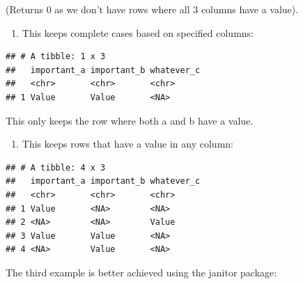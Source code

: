 \documentclass[
]{book}
\newenvironment{Shaded}{\begin{snugshade}}{\end{snugshade}}
\newcommand{\KeywordTok}[1]{\textcolor[rgb]{0.13,0.29,0.53}{\textbf{#1}}}
\newcommand{\NormalTok}[1]{#1}
\newcommand{\OperatorTok}[1]{\textcolor[rgb]{0.81,0.36,0.00}{\textbf{#1}}}
\newcommand{\StringTok}[1]{\textcolor[rgb]{0.31,0.60,0.02}{#1}}
\providecommand{\tightlist}{%
  \setlength{\itemsep}{0pt}\setlength{\parskip}{0pt}}
\begin{document}
(Returns 0 as we don't have rows where all 3 columns have a value).

\begin{enumerate}
\def\labelenumi{(\arabic{enumi})}
\setcounter{enumi}{1}
\tightlist
\item
  This keeps complete cases based on specified columns:
\end{enumerate}

\begin{Shaded}
\end{Shaded}

\begin{verbatim}
## # A tibble: 1 x 3
##   important_a important_b whatever_c
##   <chr>       <chr>       <chr>     
## 1 Value       Value       <NA>
\end{verbatim}

This only keeps the row where both a and b have a value.

\begin{enumerate}
\def\labelenumi{(\arabic{enumi})}
\setcounter{enumi}{2}
\tightlist
\item
  This keeps rows that have a value in any column:
\end{enumerate}

\begin{Shaded}
\end{Shaded}

\begin{verbatim}
## # A tibble: 4 x 3
##   important_a important_b whatever_c
##   <chr>       <chr>       <chr>     
## 1 Value       <NA>        <NA>      
## 2 <NA>        <NA>        Value     
## 3 Value       Value       <NA>      
## 4 <NA>        Value       <NA>
\end{verbatim}

The third example is better achieved using the janitor package:

\begin{Shaded}
\end{Shaded}
\end{document}
